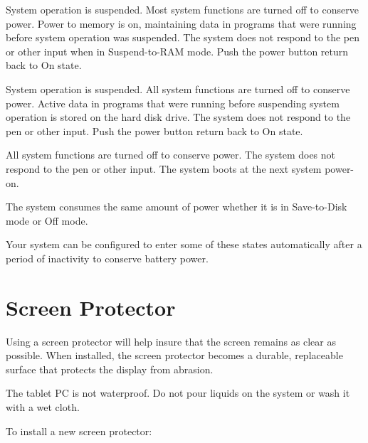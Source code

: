 System operation is suspended. Most system functions are turned off to
conserve power. Power to memory is on, maintaining data in programs that
were running before system operation was suspended. The system does not
respond to the pen or other input when in Suspend-to-RAM mode. Push the
power button return back to On state.
\stopdescription

System operation is suspended. All system functions are turned off to
conserve power. Active data in programs that were running before suspending
system operation is stored on the hard disk drive. The system does not
respond to the pen or other input. Push the power button return back to On
state.
\stopdescription

All system functions are turned off to conserve power. The system does not
respond to the pen or other input. The system boots at the next system
power-on.
\stopdescription

The system consumes the same amount of power whether it is in
Save-to-Disk mode or Off mode.
\stopNOTE

Your system can be configured to enter some of these states automatically after
a period of inactivity to conserve battery power.

\section[screen-protector]{Screen Protector}

Using a screen protector will help insure that the screen remains as clear as
possible. When installed, the screen protector becomes a durable, replaceable
surface that protects the display from abrasion.

The tablet PC is not waterproof. Do not pour liquids on the system or
wash it with a wet cloth.
\stopNOTE

To install a new screen protector:

